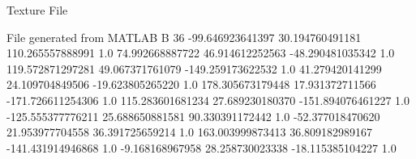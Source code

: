 Texture File

File generated from MATLAB
B 36
-99.646923641397   30.194760491181  110.265557888991  1.0
  74.992668887722   46.914612252563  -48.290481035342 1.0
 119.572871297281   49.067371761079 -149.259173622532 1.0
  41.279420141299   24.109704849506  -19.623805265220 1.0
 178.305673179448   17.931372711566 -171.726611254306 1.0
 115.283601681234   27.689230180370 -151.894076461227 1.0
-125.555377776211   25.688650881581   90.330391172442 1.0
 -52.377018470620   21.953977704558   36.391725659214 1.0
 163.003999873413   36.809182989167 -141.431914946868 1.0
  -9.168168967958   28.258730023338  -18.115385104227 1.0
  
